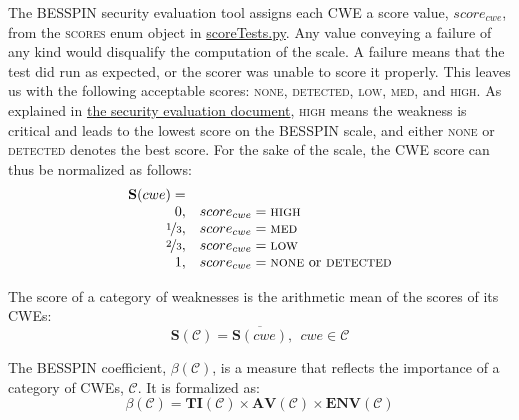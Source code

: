 \documentclass{article}
\begin{document}
The BESSPIN security evaluation tool assigns each CWE a score value, $score_{cwe}$, from the {\scshape scores} enum object in \href{https://github.com/DARPA-SSITH-Demonstrators/SSITH-FETT-Target/blob/develop/fett/cwesEvaluation/scoreTests.py}{scoreTests.py}. Any value conveying a failure of any kind would disqualify the computation of the scale. A failure means that the test did run as expected, or the scorer was unable to score it properly. This leaves us with the following acceptable scores: {\scshape none}, {\scshape detected}, {\scshape low}, {\scshape med}, and {\scshape high}. As explained in \href{https://github.com/DARPA-SSITH-Demonstrators/SSITH-FETT-Target/blob/develop/docs/cwesEvaluation/evaluateSecurityTestsMode.md}{the security evaluation document}, {\scshape high} means the weakness is critical and leads to the lowest score on the BESSPIN scale, and either {\scshape none} or {\scshape detected} denotes the best score. For the sake of the scale, the CWE score can thus be normalized as follows:
\begin{equation}
\begin{array}{rl}
\mathbf{S}(cwe) = \\ 
      0, &   score_{cwe} = \text{{\scshape high}} \\
      \nicefrac{1}{3}, & score_{cwe} = \text{{\scshape med}} \\
      \nicefrac{2}{3}, & score_{cwe} = \text{{\scshape low}} \\
      1, &    score_{cwe} = \text{{\scshape none} or {\scshape detected}}
\end{array}
\end{equation}

The score of a category of weaknesses is the arithmetic mean of the scores of its CWEs:
\begin{equation}
    \mathbf{S}(\mathcal{C}) = \overline{\mathbf{S}(cwe)}, \ \ cwe \in \mathcal{C}
\end{equation}

The BESSPIN coefficient, $\beta(\mathcal{C})$, is a measure that reflects the importance of a category of CWEs, $\mathcal{C}$. It is formalized as: 
\begin{equation}
    \beta(\mathcal{C}) = \mathbf{TI}(\mathcal{C}) 
    \times \mathbf{AV}(\mathcal{C}) 
    \times \mathbf{ENV}(\mathcal{C})
\end{equation}
\end{document}
